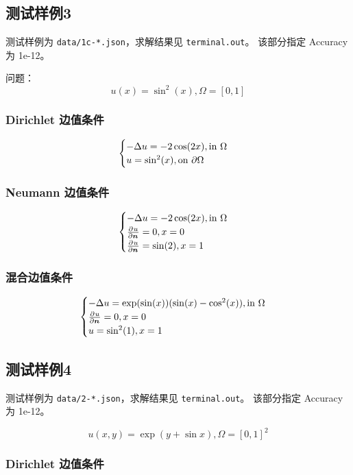\documentclass[lang=cn,a4paper,newtx,bibend=bibtex]{elegantpaper}
\begin{document}
\subsection{测试样例3}

测试样例为 \texttt{data/1c-*.json}，求解结果见 \texttt{terminal.out}。
该部分指定 Accuracy 为 1e-12。

问题： 
\[
  u(x) = \sin^2(x), \Omega = [0, 1]
\]

\subsubsection{Dirichlet 边值条件}

\[
  \begin{cases} 
  -\Delta u = -2 \cos(2x), \text{in} ~\Omega \\
  u = \sin^2(x), \text{on}~\partial \Omega
   \end{cases}
\]




\subsubsection{Neumann 边值条件}

\[
  \begin{cases} 
  -\Delta u = -2 \cos(2x), \text{in} ~\Omega \\
  \frac{\partial^{}{u}}{\partial {\bm{n}}^{}} = 0, x = 0 \\
  \frac{\partial^{}{u}}{\partial {\bm{n}}^{}} = \sin(2), x = 1
   \end{cases}
\]



\subsubsection{混合边值条件}

\[
  \begin{cases} 
  -\Delta u = \exp(\sin(x)) (\sin(x) - \cos^2(x)), \text{in} ~\Omega \\
  \frac{\partial^{}{u}}{\partial {\bm{n}}^{}} = 0, x = 0 \\
  u = \sin^2(1), x = 1
   \end{cases}
\]




\subsection{测试样例4}

测试样例为 \texttt{data/2-*.json}，求解结果见 \texttt{terminal.out}。
该部分指定 Accuracy 为 1e-12。

\[
  u(x, y) = \exp (y + \sin x), \Omega = [0, 1]^2
\]

\subsubsection{Dirichlet 边值条件}
\end{document}
